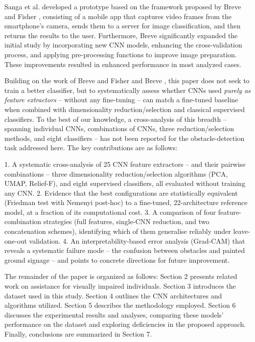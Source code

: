 \documentclass[final,5p,times,twocolumn]{elsarticle}
\begin{document}
Sanga et al. \cite{sanga2023} developed a prototype based on the framework proposed by Breve and Fisher \cite{breve2020}, consisting of a mobile app that captures video frames from the smartphone's camera, sends them to a server for image classification, and then returns the results to the user. Furthermore, Breve \cite{breve2023} significantly expanded the initial study by incorporating new CNN models, enhancing the cross-validation process, and applying pre-processing functions to improve image preparation. These improvements resulted in enhanced performance in most analyzed cases.

Building on the work of Breve and Fisher \cite{breve2020} and Breve \cite{breve2023}, this paper does not seek to train a better classifier, but to systematically assess whether CNNs used \emph{purely as feature extractors} -- without any fine-tuning -- can match a fine-tuned baseline when combined with dimensionality reduction/selection and classical supervised classifiers. To the best of our knowledge, a cross-analysis of this breadth -- spanning individual CNNs, combinations of CNNs, three reduction/selection methods, and eight classifiers -- has not been reported for the obstacle-detection task addressed here. The key contributions are as follows:

1. A systematic cross-analysis of 25 CNN feature extractors -- and their pairwise combinations -- three dimensionality reduction/selection algorithms (PCA, UMAP, Relief-F), and eight supervised classifiers, all evaluated without training any CNN.
2. Evidence that the best configurations are statistically equivalent (Friedman test with Nemenyi post-hoc) to a fine-tuned, 22-architecture reference model, at a fraction of its computational cost.
3. A comparison of four feature-combination strategies (full features, single-CNN reduction, and two concatenation schemes), identifying which of them generalise reliably under leave-one-out validation.
4. An interpretability-based error analysis (Grad-CAM) that reveals a systematic failure mode -- the confusion between obstacles and painted ground signage -- and points to concrete directions for future improvement.

The remainder of the paper is organized as follows: Section 2 presents related work on assistance for visually impaired individuals. Section 3 introduces the dataset used in this study. Section 4 outlines the CNN architectures and algorithms utilized. Section 5 describes the methodology employed. Section 6 discusses the experimental results and analyses, comparing these models' performance on the dataset and exploring deficiencies in the proposed approach. Finally, conclusions are summarized in Section 7. 
\end{document}

